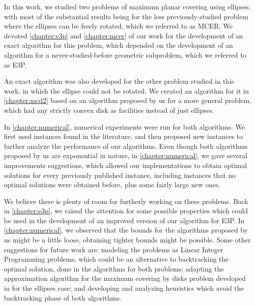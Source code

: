 In this work, we studied two problems of maximum planar covering using ellipses, with most of the substantial results being for the less previously-studied problem where the ellipses can be freely rotated, which we referred to as MCER. We devoted \autoref{chapter:e3p} and \autoref{chapter:mcer} of our work for the development of an exact algorithm for this problem, which depended on the development of an algorithm for a never-studied-before geometric subproblem, which we referred to as E3P. 

An exact algorithm was also developed for the other problem studied in this work, in which the ellipse could not be rotated. We created an algorithm for it in \autoref{chapter:mcd2} based on an algorithm proposed by us for a more general problem, which had any strictly convex disk as facilities instead of just ellipses.

In \autoref{chapter:numerical}, numerical experiments were run for both algorithms. We first used instances found in the literature, and then proposed new instances to further analyze the performance of our algorithms.
Even though both algorithms proposed by us are exponential in nature, 
in \autoref{chapter:numerical}, we gave several improvements suggestions, which allowed our implementations to obtain optimal solutions for every previously published instance, including instances that no optimal solutions were obtained before, plus some fairly large new ones.

We believe there is plenty of room for furtherly working on these problems.
Back in \autoref{chapter:e3p}, we raised the attention for some possible properties which could be used in the development of an improved version of our algorithm for E3P.
In \autoref{chapter:numerical}, we observed that the bounds for the algorithms proposed by us might be a little loose, obtaining tighter bounds might be possible.
Some other suggestions for future work are: modeling the problems as Linear Integer Programming problems, which could be an alternative to backtracking the optimal solution, done in the algorithms for both problems; adapting the  approximation algorithm for the maximum covering by disks problem developed in  for the ellipses case; and developing and analyzing heuristics which avoid the backtracking phase of both algorithms.
